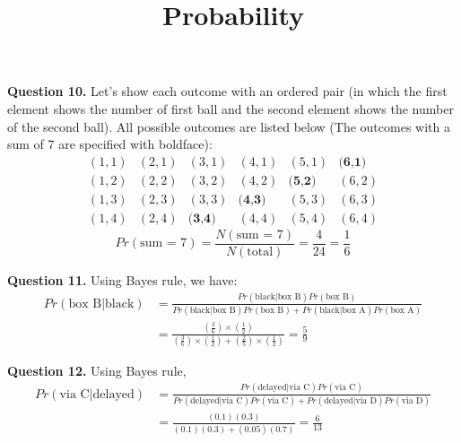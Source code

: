 \documentclass{ximera}
\title{Probability}
\begin{document}
\maketitle

\textbf{Question 10.} Let's show each outcome with an ordered pair (in which the first element shows the number of first ball and the second element shows the number of the second ball). All possible outcomes are listed below (The outcomes with a sum of 7 are specified with boldface):
\begin{equation*}
\begin{matrix}
(1,1) & (2,1) & (3,1) & (4,1) & (5,1) & \textbf{(6,1)} \\
(1,2) & (2,2) & (3,2) & (4,2) & \textbf{(5,2)} & (6,2) \\
(1,3) & (2,3) & (3,3) & \textbf{(4,3)} & (5,3) & (6,3) \\
(1,4) & (2,4) & \textbf{(3,4)} & (4,4) & (5,4) & (6,4)
\end{matrix}
\end{equation*}
\begin{equation*}
Pr (\text{sum = 7}) = \frac{N(\text{sum = 7})}{N(\text{total})} = \frac{4}{24} = \frac{1}{6}
\end{equation*}

\textbf{Question 11.} Using Bayes rule, we have:
\begin{align*}
Pr (\text{box B} | \text{black}) &= \frac{Pr(\text{black} | \text{box B}) Pr(\text{box B})}{Pr(\text{black} | \text{box B}) Pr(\text{box B}) + Pr(\text{black} | \text{box A}) Pr(\text{box A})} \\
&=\frac{(\frac{3}{6}) \times (\frac{1}{2})}{(\frac{3}{6}) \times (\frac{1}{2}) + (\frac{2}{5}) \times (\frac{1}{2})} = \frac{5}{9}
\end{align*}

\textbf{Question 12.} Using Bayes rule,
\begin{align*}
Pr (\text{via C} | \text{delayed}) &= \frac{Pr(\text{delayed} | \text{via C}) Pr(\text{via C})}{Pr(\text{delayed} | \text{via C}) Pr(\text{via C}) + Pr(\text{delayed} | \text{via D}) Pr(\text{via D})} \\
& = \frac{(0.1)(0.3)}{(0.1)(0.3) + (0.05)(0.7)} = \frac{6}{13}
\end{align*}
\end{document}

